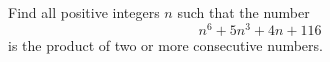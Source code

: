 Find all positive integers $n$ such that the number$$n^6 + 5n^3 + 4n + 116$$is the product of two or more consecutive numbers.